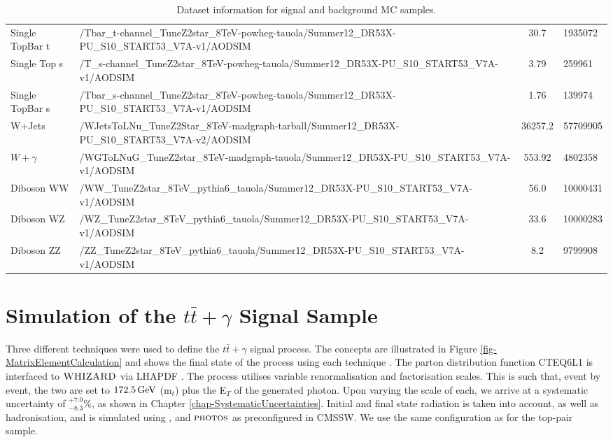\begin{table}
\begin{center}
{\begin{tabular}{|l| p{12.5cm} |c|p{2cm}|}
	Single TopBar t & /Tbar\_t-channel\_TuneZ2star\_8TeV-powheg-tauola/Summer12\_DR53X-PU\_S10\_START53\_V7A-v1/AODSIM & 30.7 & 1935072 \\
	Single Top s & /T\_s-channel\_TuneZ2star\_8TeV-powheg-tauola/Summer12\_DR53X-PU\_S10\_START53\_V7A-v1/AODSIM & 3.79 & 259961 \\
	Single TopBar s & /Tbar\_s-channel\_TuneZ2star\_8TeV-powheg-tauola/Summer12\_DR53X-PU\_S10\_START53\_V7A-v1/AODSIM  & 1.76 & 139974 \\
\hline	
	W+Jets & /WJetsToLNu\_TuneZ2Star\_8TeV-madgraph-tarball/Summer12\_DR53X-PU\_S10\_START53\_V7A-v2/AODSIM & 36257.2 & 57709905 \\
\hline	
	$W+\gamma$ & /WGToLNuG\_TuneZ2star\_8TeV-madgraph-tauola/Summer12\_DR53X-PU\_S10\_START53\_V7A-v1/AODSIM & 553.92 & 4802358 \\
\hline	
	Diboson WW & /WW\_TuneZ2star\_8TeV\_pythia6\_tauola/Summer12\_DR53X-PU\_S10\_START53\_V7A-v1/AODSIM & 56.0 & 10000431\\
	Diboson WZ & /WZ\_TuneZ2star\_8TeV\_pythia6\_tauola/Summer12\_DR53X-PU\_S10\_START53\_V7A-v1/AODSIM & 33.6 & 10000283\\
	Diboson ZZ & /ZZ\_TuneZ2star\_8TeV\_pythia6\_tauola/Summer12\_DR53X-PU\_S10\_START53\_V7A-v1/AODSIM & 8.2 & 9799908\\
\hline	
\end{tabular}
}
\caption{Dataset information for signal and background MC samples.}
\end{center}
\end{table}


\section{Simulation of the $t\bar{t}+\gamma$ Signal Sample} \label{sec-mcsim}

Three different techniques were used to define the $t\bar{t}+\gamma$ signal process. The concepts are illustrated in Figure \ref{fig-MatrixElementCalculation} and shows the final state of the process using each technique \cite{heinerthesis}. The parton distribution function CTEQ6L1 \cite{Pumplin:2002vw} is interfaced to ${\textsc{WHIZARD}}$ via LHAPDF \cite{Whalley:2005nh}. The process utilises variable renormalisation and factorisation scales. This is such that, event by event, the two are set to $172.5 \,\text{Ge\hspace{-.08em}V}$ (m$_t$) plus the E$_T$ of the generated photon. Upon varying the scale of each, we arrive at a systematic uncertainty of $^{+7.0}_{-8.3}\%$, as shown in Chapter \ref{chap-SystematicUncertainties}. Initial and final state radiation is taken into account, as well as hadronisation, and is simulated using  \cite{Sjostrand:2006za}, \TAUOLA and $\textsc{photos}$ \cite{Was:2006my} as preconfigured in CMSSW. We use the same configuration as for the top-pair sample.

